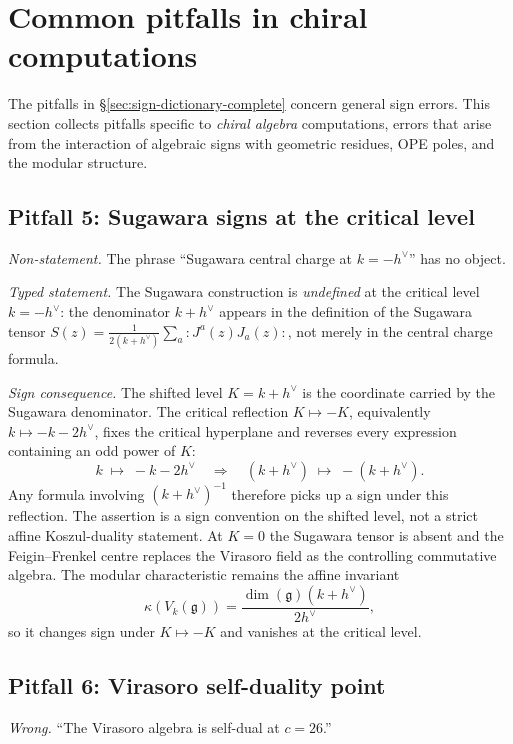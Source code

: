 \section{Common pitfalls in chiral computations}
\label{sec:chiral-pitfalls}

The pitfalls in \S\ref{sec:sign-dictionary-complete} concern general sign
errors. This section collects pitfalls specific to \emph{chiral algebra}
computations, errors that arise from the interaction of algebraic signs with
geometric residues, OPE poles, and the modular structure.

\subsection{Pitfall 5: Sugawara signs at the critical level}

\emph{Non-statement.} The phrase ``Sugawara central charge at
$k = -h^\vee$'' has no object.

\emph{Typed statement.} The Sugawara construction is \emph{undefined} at the critical
level $k = -h^\vee$: the denominator $k + h^\vee$ appears in the definition
of the Sugawara tensor $S(z) = \frac{1}{2(k+h^\vee)} \sum_a {:}J^a(z)J_a(z){:}$,
not merely in the central charge formula.

\emph{Sign consequence.} The shifted level
$K = k + h^\vee$ is the coordinate carried by the Sugawara denominator.
The critical reflection $K \mapsto -K$, equivalently
$k \mapsto -k - 2h^\vee$, fixes the critical hyperplane and reverses
every expression containing an odd power of $K$:
\[
k \;\longmapsto\; -k - 2h^\vee
\quad\Longrightarrow\quad
(k + h^\vee) \;\longmapsto\; -(k + h^\vee).
\]
Any formula involving $(k + h^\vee)^{-1}$ therefore picks up a sign under
this reflection. The assertion is a sign convention on the shifted
level, not a strict affine Koszul-duality statement. At
$K=0$ the Sugawara tensor is absent and the Feigin--Frenkel centre
replaces the Virasoro field as the controlling commutative algebra.
The modular characteristic remains the affine invariant
\[
\kappa(V_k(\mathfrak g))
 = \frac{\dim(\mathfrak g)(k+h^\vee)}{2h^\vee},
\]
so it changes sign under $K\mapsto -K$ and vanishes at the
critical level.

\subsection{Pitfall 6: Virasoro self-duality point}

\emph{Wrong.} ``The Virasoro algebra is self-dual at $c = 26$.''

